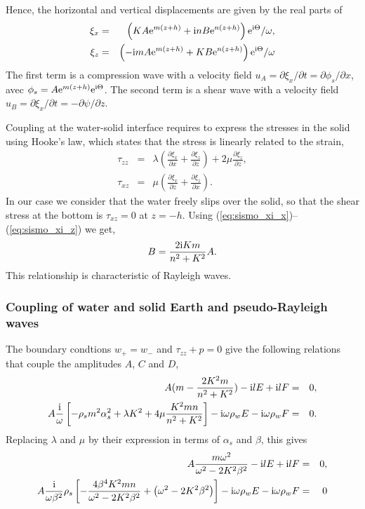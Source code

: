 Hence, the horizontal and vertical displacements are given by the real parts of 
\begin{eqnarray}
\xi_x &=&  \left(K A  \mathrm{e}^{m(z+h)}      + \mathrm{i} n B  \mathrm{e}^{n(z+h)}\right)  \mathrm{e}^{\mathrm{i} \Theta} \label{eq:sismo_xi_x}/\omega, \\
\xi_z &=&    \left(- \mathrm{i} m A  \mathrm{e}^{m(z+h)} +  K B  \mathrm{e}^{n(z+h)} \right) \mathrm{e}^{\mathrm{i} \Theta} /\omega \label{eq:sismo_xi_z}
\end{eqnarray}
The first term is a compression wave with a velocity field
$u_A =\partial \xi_x /\partial t = \partial \phi_s / \partial x$, 
avec $\phi_s =  A \mathrm{e}^{m(z+h)}\mathrm{e}^{\mathrm{i} \Theta} $. 
The second term is a shear wave with a velocity field 
$u_B =\partial \xi_x /\partial t = -\partial \psi / \partial z$. 


Coupling at the water-solid interface requires to express the stresses in the solid using Hooke's law, which states that the 
stress is linearly related to the strain,
\begin{eqnarray}
\tau_{zz}   &=& \lambda \left(\frac{\partial \xi_x}{\partial x} + \frac{\partial \xi_z}{\partial z}\right) + 2 \mu \frac{\partial \xi_z}{\partial z}, \\
\tau_{xz}   &=& \mu  \left(\frac{\partial \xi_x}{\partial z} + \frac{\partial \xi_z}{\partial x}\right).
\end{eqnarray}
In our case we consider that the water freely slips over the solid, so that the shear stress 
at the bottom is  $\tau_{xz} = 0$ at $z=-h$. Using  (\ref{eq:sismo_xi_x})--(\ref{eq:sismo_xi_z}) we get, 
\begin{eqnarray}
 B= \frac{2 \mathrm{i} K m}{n^2+K^2} A.
\end{eqnarray}
This relationship is characteristic of Rayleigh waves. 

\subsubsection{Coupling of water and solid Earth and pseudo-Rayleigh waves}
The boundary condtions $w_+=  w_-$ and $\tau_{zz} + p=0$ give the following relations that couple the amplitudes  
$A$, $C$ and $D$, 
\begin{eqnarray}
 A   (m - \frac{2 K^2 m}{n^2+K^2}) - \mathrm{i} l E + \mathrm{i} l F &= &0, \\
 A \frac{\mathrm{i}}{\omega} \left[ - \rho_s  m^2 \alpha_s^2  
             + \lambda  K^2 + 4 \mu \frac{K^2 m n}{n^2+K^2} \right] - \mathrm{i} \omega  {\rho_w} E - \mathrm{i} \omega {\rho_w} F &=& 0.
\end{eqnarray}
Replacing $\lambda$ and $\mu$ by their expression in terms of  $\alpha_s$ and $\beta$, this gives
\begin{eqnarray}
 A   \frac{m \omega^2}{\omega^2-2K^2 \beta^2} - \mathrm{i} l E + \mathrm{i} l F &= &0, \\
  A \frac{\mathrm{i}}{\omega \beta^2} \rho_s\left[- \frac{4 \beta^4 K^2 m n}{\omega^2- 2K^2 \beta^2} + \left(\omega^2- 2K^2 \beta^2 \right)\right]
 - \mathrm{i} \omega  \rho_w E - \mathrm{i} \omega \rho_w F &=& 0 
\end{eqnarray}


